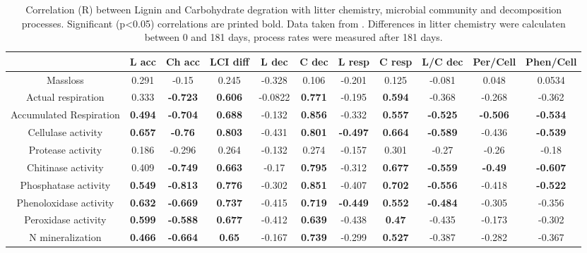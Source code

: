\documentclass[authoryear,preprint,review,12pt]{elsarticle}
\begin{document}
\begin{table}[h!]
\begin{center}
\caption{Correlation (R) between Lignin and Carbohydrate degration with litter chemistry, microbial community and decomposition processes. Significant (p<0.05) correlations are printed bold. Data taken from \cite{Mooshammer2011, Leitner2011}. Differences in litter chemistry were calculaten between 0 and 181 days, process rates were measured after 181 days.}
\label{corrtable}
{\tiny
\begin{tabular}{ccccccccccc}
  \hline
 & L acc & Ch acc & LCI diff & L dec & C dec & L resp & C resp & L/C dec & Per/Cell & Phen/Cell \\ 
  \hline
Massloss & 0.291 & -0.15 & 0.245 & -0.328 & 0.106 & -0.201 & 0.125 & -0.081 & 0.048 & 0.0534 \\ 
  Actual respiration & 0.333 & \textbf{ -0.723 } & \textbf{ 0.606 } & -0.0822 & \textbf{ 0.771 } & -0.195 & \textbf{ 0.594 } & -0.368 & -0.268 & -0.362 \\ 
  Accumulated Respiration & \textbf{ 0.494 } & \textbf{ -0.704 } & \textbf{ 0.688 } & -0.132 & \textbf{ 0.856 } & -0.332 & \textbf{ 0.557 } & \textbf{ -0.525 } & \textbf{ -0.506 } & \textbf{ -0.534 } \\ 
  Cellulase activity & \textbf{ 0.657 } & \textbf{ -0.76 } & \textbf{ 0.803 } & -0.431 & \textbf{ 0.801 } & \textbf{ -0.497 } & \textbf{ 0.664 } & \textbf{ -0.589 } & -0.436 & \textbf{ -0.539 } \\ 
  Protease activity & 0.186 & -0.296 & 0.264 & -0.132 & 0.274 & -0.157 & 0.301 & -0.27 & -0.26 & -0.18 \\ 
  Chitinase activity & 0.409 & \textbf{ -0.749 } & \textbf{ 0.663 } & -0.17 & \textbf{ 0.795 } & -0.312 & \textbf{ 0.677 } & \textbf{ -0.559 } & \textbf{ -0.49 } & \textbf{ -0.607 } \\ 
  Phosphatase activity & \textbf{ 0.549 } & \textbf{ -0.813 } & \textbf{ 0.776 } & -0.302 & \textbf{ 0.851 } & -0.407 & \textbf{ 0.702 } & \textbf{ -0.556 } & -0.418 & \textbf{ -0.522 } \\ 
  Phenoloxidase activity & \textbf{ 0.632 } & \textbf{ -0.669 } & \textbf{ 0.737 } & -0.415 & \textbf{ 0.719 } & \textbf{ -0.449 } & \textbf{ 0.552 } & \textbf{ -0.484 } & -0.305 & -0.356 \\ 
  Peroxidase activity & \textbf{ 0.599 } & \textbf{ -0.588 } & \textbf{ 0.677 } & -0.412 & \textbf{ 0.639 } & -0.438 & \textbf{ 0.47 } & -0.435 & -0.173 & -0.302 \\ 
  N mineralization & \textbf{ 0.466 } & \textbf{ -0.664 } & \textbf{ 0.65 } & -0.167 & \textbf{ 0.739 } & -0.299 & \textbf{ 0.527 } & -0.387 & -0.282 & -0.367 \\ 

\end{tabular}}
\end{center}
\end{table}
\end{document}
